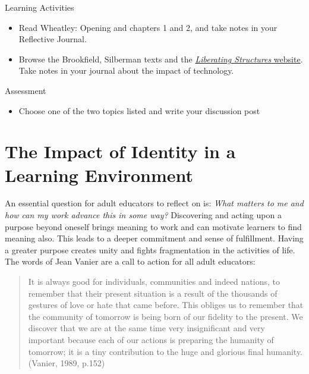 \documentclass[
]{book}
\providecommand{\tightlist}{%
  \setlength{\itemsep}{0pt}\setlength{\parskip}{0pt}}
\begin{document}
\begin{reflect}
{Learning Activities}

\begin{itemize}
\tightlist
\item
  Read Wheatley: Opening and chapters 1 and 2, and take notes in your Reflective Journal.\\
\item
  Browse the Brookfield, Silberman texts and the \href{http://www.liberatingstructures.com/ls-menu/}{\emph{Liberating Structures} website}. Take notes in your journal about the impact of technology.
\end{itemize}
\end{reflect}

\begin{assessment}
{Assessment}

\begin{itemize}
\tightlist
\item
  Choose one of the two topics listed and write your discussion post
\end{itemize}
\end{assessment}

\hypertarget{the-impact-of-identity-in-a-learning-environment}{%
\section{The Impact of Identity in a Learning Environment}\label{the-impact-of-identity-in-a-learning-environment}}

An essential question for adult educators to reflect on is: \emph{What matters to me and how can my work advance this in some way?} Discovering and acting upon a purpose beyond oneself brings meaning to work and can motivate learners to find meaning also. This leads to a deeper commitment and sense of fulfillment. Having a greater purpose creates unity and fights fragmentation in the activities of life. The words of Jean Vanier are a call to action for all adult educators:

\begin{quote}
It is always good for individuals, communities and indeed nations, to remember that their present situation is a result of the thousands of gestures of love or hate that came before. This obliges us to remember that the community of tomorrow is being born of our fidelity to the present. We discover that we are at the same time very insignificant and very important because each of our actions is preparing the humanity of tomorrow; it is a tiny contribution to the huge and glorious final humanity. (Vanier, 1989, p.152)
\end{quote}
\end{document}
